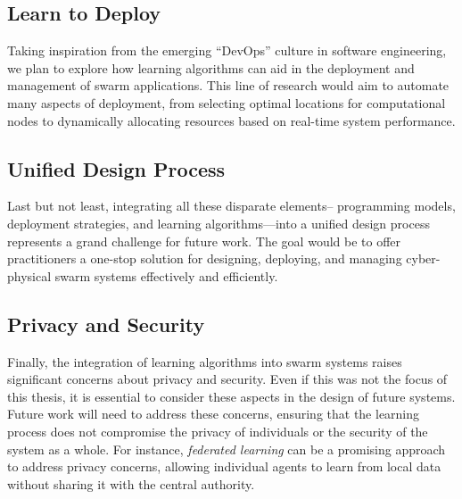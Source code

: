 \subsection*{Learn to Deploy}
Taking inspiration from the emerging ``DevOps'' culture in software engineering, 
 we plan to explore how learning algorithms can aid in the deployment and management of swarm applications. 
 This line of research would aim to automate many aspects of deployment, 
 from selecting optimal locations for computational nodes to dynamically allocating resources based on real-time system performance.

\subsection*{Unified Design Process}
Last but not least, 
 integrating all these disparate elements--
 programming models, deployment strategies, and learning algorithms---into a unified design process represents a grand challenge for future work. 
 The goal would be to offer practitioners a one-stop solution for designing, deploying, and managing cyber-physical swarm systems effectively and efficiently.

\subsection*{Privacy and Security}
Finally, 
 the integration of learning algorithms into swarm systems raises significant concerns about privacy and security.
%
Even if this was not the focus of this thesis, 
 it is essential to consider these aspects in the design of future systems.
Future work will need to address these concerns, 
 ensuring that the learning process does not compromise the privacy of individuals or the security of the system as a whole.
%
For instance, \emph{federated learning} can be a promising approach to address privacy concerns, 
 allowing individual agents to learn from local data without sharing it with the central authority.
